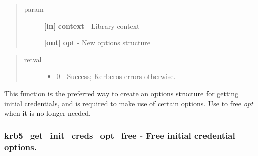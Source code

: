 \documentclass[letterpaper,10pt,english]{sphinxmanual}
\begin{document}
\begin{fulllineitems}
\label{appdev/refs/api/krb5_get_init_creds_opt_alloc:c.krb5_get_init_creds_opt_alloc}
\end{fulllineitems}

\begin{quote}\begin{description}
\item[{param}] \leavevmode
\textbf{{[}in{]}} \textbf{context} - Library context

\textbf{{[}out{]}} \textbf{opt} - New options structure

\end{description}\end{quote}
\begin{quote}\begin{description}
\item[{retval}] \leavevmode\begin{itemize}
\item {} 
0   - Success; Kerberos errors otherwise.

\end{itemize}

\end{description}\end{quote}

This function is the preferred way to create an options structure for getting initial credentials, and is required to make use of certain options. Use {\hyperref[appdev/refs/api/krb5_get_init_creds_opt_free:c.krb5_get_init_creds_opt_free]{}} to free \emph{opt} when it is no longer needed.


\subsubsection{krb5\_get\_init\_creds\_opt\_free -  Free initial credential options.}
\label{appdev/refs/api/krb5_get_init_creds_opt_free::doc}\label{appdev/refs/api/krb5_get_init_creds_opt_free:krb5-get-init-creds-opt-free-free-initial-credential-options}
\end{document}
